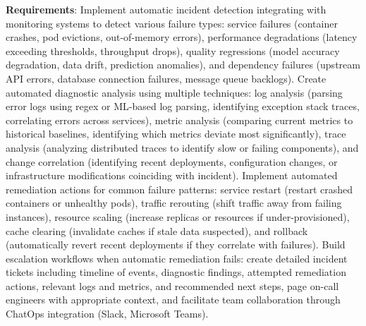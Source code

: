 \textbf{Requirements}: Implement automatic incident detection integrating with monitoring systems to detect various failure types: service failures (container crashes, pod evictions, out-of-memory errors), performance degradations (latency exceeding thresholds, throughput drops), quality regressions (model accuracy degradation, data drift, prediction anomalies), and dependency failures (upstream API errors, database connection failures, message queue backlogs). Create automated diagnostic analysis using multiple techniques: log analysis (parsing error logs using regex or ML-based log parsing, identifying exception stack traces, correlating errors across services), metric analysis (comparing current metrics to historical baselines, identifying which metrics deviate most significantly), trace analysis (analyzing distributed traces to identify slow or failing components), and change correlation (identifying recent deployments, configuration changes, or infrastructure modifications coinciding with incident). Implement automated remediation actions for common failure patterns: service restart (restart crashed containers or unhealthy pods), traffic rerouting (shift traffic away from failing instances), resource scaling (increase replicas or resources if under-provisioned), cache clearing (invalidate caches if stale data suspected), and rollback (automatically revert recent deployments if they correlate with failures). Build escalation workflows when automatic remediation fails: create detailed incident tickets including timeline of events, diagnostic findings, attempted remediation actions, relevant logs and metrics, and recommended next steps, page on-call engineers with appropriate context, and facilitate team collaboration through ChatOps integration (Slack, Microsoft Teams).

